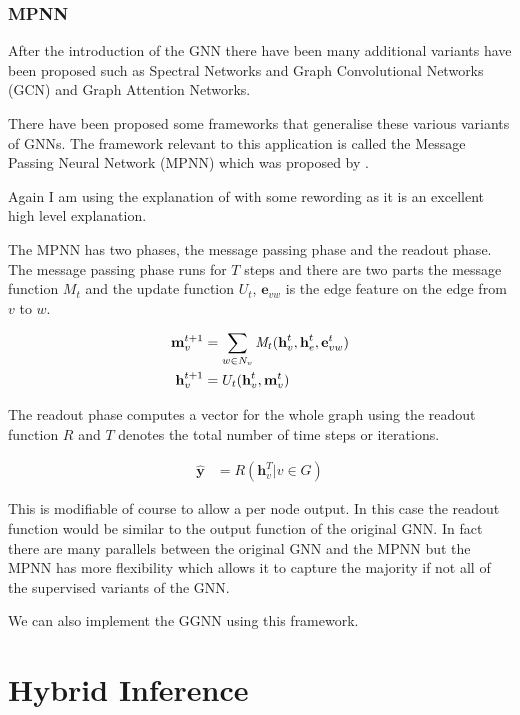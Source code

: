 \documentclass[]{../resources/final_report}
\begin{document}
\subsubsection{MPNN}

After the introduction of the GNN there have been many additional variants have been proposed
such as Spectral Networks and Graph Convolutional Networks (GCN) and Graph Attention Networks.

There have been proposed some frameworks that generalise these various variants of GNNs.
The framework relevant to this application is called the Message Passing Neural Network (MPNN) which was proposed by \cite{mpnn}.

Again I am using the explanation of \cite{graphoverview} with some rewording as it is an excellent high level explanation.

The MPNN has two phases, the message passing phase and the readout phase. The message passing phase runs for $T$ steps and there are two parts 
the message function $M_t$ and the update function $U_t$, $\textbf{e}_{vw}$ is the edge feature on the edge from $v$ to $w$.

\begin{align}
  \textbf{m}^{t+1}_v &= \sum_{w \in N_v} \emph{M}_t(\textbf{h}^t_v, \textbf{h}^t_e, \textbf{e}^t_{vw})\\
  \textbf{h}^{t+1}_v &= U_t(\textbf{h}^t_v, \textbf{m}^t_v)
\end{align}

The readout phase computes a vector for the whole graph using the readout function $R$ and $T$ denotes the total number of time steps or iterations.

\begin{align}
  \hat{\textbf{y}} &= R({\textbf{h}^T_v | v \in G})
\end{align}

This is modifiable of course to allow a per node output. In this case the readout function would be 
similar to the output function of the original GNN. In fact there are many parallels between the 
original GNN and the MPNN but the MPNN has more flexibility which allows it to capture 
the majority if not all of the supervised variants of the GNN.

We can also implement the GGNN using this framework.


\section{Hybrid Inference}
\end{document}

